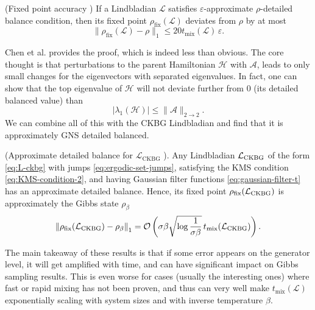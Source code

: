 \begin{corollary}
    \textup{(Fixed point accuracy \cite{chen2023quantum})} If a Lindbladian $\mathcal{L}$ satisfies $\varepsilon$-approximate $\rho$-detailed balance condition, then its fixed point $\rho_\text{fix}(\mathcal{L})$ deviates from $\rho$ by at most $$\|\rho_\text{fix}(\mathcal{L}) - \rho\|_1 \leq 20 t_\text{mix}(\mathcal{L})\,\varepsilon .$$
\end{corollary}
\noindent Chen et al. provides the proof, which is indeed less than obvious. The core thought is that perturbations to the parent Hamiltonian $\mathcal{H}$ with $\mathcal{A}$, leads to only small changes for the eigenvectors with separated eigenvalues. In fact, one can show that the top eigenvalue of $\mathcal{H}$ will not deviate further from $0$ (its detailed balanced value) than $$|\lambda_1(\mathcal{H})| \leq \|\mathcal{A}\|_{2\rightarrow 2}.$$ We can combine all of this with the CKBG Lindbladian and find that it is approximately GNS detailed balanced.
\begin{theorem}
    \textup{(Approximate detailed balance for $\mathcal{L}_\text{CKBG}$  \cite{chen2023quantum})}. Any Lindbladian $\mathcal{L}_\textup{CKBG}$ of the form \eqref{eq:L-ckbg} with jumps \eqref{eq:ergodic-set-jumps}, satisfying the KMS condition \eqref{eq:KMS-condition-2}, and having Gaussian filter functions \eqref{eq:gaussian-filter-t} has an approximate detailed balance. Hence, its fixed point $\rho_\textup{fix}(\mathcal{L_\textup{CKBG}})$ is approximately the Gibbs state $\rho_\beta$
    $$
    \left\|\rho_\textup{fix}(\mathcal{L}_\textup{CKBG}) - \rho_\beta\right\|_1 = \mathcal{O}\left(\sigma \beta \sqrt{\log\frac{1}{\sigma \beta}}\,t_\textup{mix}(\mathcal{L}_\textup{CKBG})\right).
    $$
\end{theorem}
The main takeaway of these results is that if some error appears on the generator level, it will get amplified with time, and can have significant impact on Gibbs sampling results.
This is even worse for cases (usually the interesting ones) where fast or rapid mixing has not been proven, and thus can very well make $t_\text{mix}(\mathcal{L})$ exponentially scaling with system sizes and with inverse temperature $\beta$.

